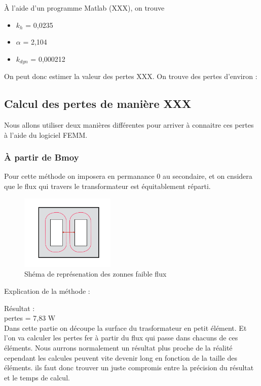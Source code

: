 À l'aide d'un programme Matlab (XXX), on trouve 
\begin{itemize}
\item  $k_h$   = 0,0235
\item $\alpha$ = 2,104
\item $k_{dyn}$ = 0,000212
\end{itemize}

On peut donc estimer la valeur des pertes XXX. On trouve des pertes d'environ : 



\subsection{Calcul des pertes de manière XXX}

Nous allons utiliser deux manières différentes pour arriver à connaitre ces pertes à l'aide du logiciel FEMM.

\subsubsection{À partir de Bmoy}

	Pour cette méthode on imposera en permanance 0 au secondaire, et on cnsidera que le flux qui travers le transformateur est équitablement réparti. \\

\begin{figure}[ht]
	\begin{center}
	\includegraphics[width=0.4\textwidth]{images/TP3_repartission_Bmoy}
	\caption{Shéma de représenation des zonnes faible flux}\label{img:RepChampsBmoy}
	\end{center}
\end{figure}
\FloatBarrier

Explication de la méthode : 


Résultat : \\
pertes = 7,83 W\\

	Dans cette partie on découpe la surface du trasformateur en petit élément. Et l'on va calculer les pertes fer à partir du flux qui passe dans chacuns de ces éléments.
 Nous aurrons normalement un résultat plus proche de la réalité cependant les calcules peuvent vite devenir long en fonction de la taille des éléments. ils faut donc trouver un juste compromis entre la précision du résultat et le temps de calcul. 


